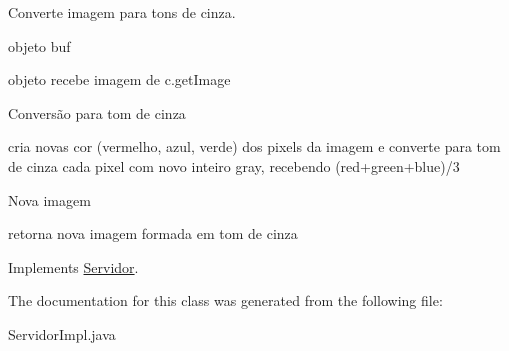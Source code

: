 Converte imagem para tons de cinza. 

objeto buf

objeto recebe imagem de c.\-get\-Image

Conversão para tom de cinza

cria novas cor (vermelho, azul, verde) dos pixels da imagem e converte para tom de cinza cada pixel com novo inteiro gray, recebendo (red+green+blue)/3

Nova imagem

retorna nova imagem formada em tom de cinza

Implements \hyperlink{interfaceServidor}{Servidor}.



The documentation for this class was generated from the following file\-:\begin{DoxyCompactItemize}
\item 
Servidor\-Impl.\-java\end{DoxyCompactItemize}
